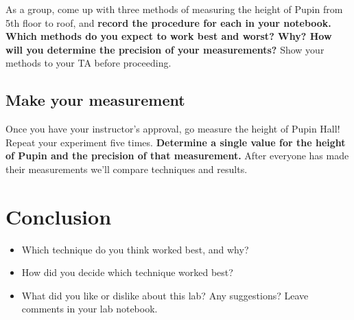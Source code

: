 \documentclass[11pt]{article}%
\newcommand{\SPACE}{\vspace{6em}}
\begin{document}
As a group, come up with three methods of measuring the height of Pupin from 5th floor to roof, and \textbf{record the procedure for each in your notebook. Which methods do you expect to work best and worst? Why? How will you determine the precision of your measurements?} Show your methods to your TA before proceeding. 
\SPACE
\SPACE
\SPACE


\newpage
\subsection{Make your measurement}
Once you have your instructor's approval, go measure the height of Pupin Hall! Repeat your experiment five times. \textbf{Determine a single value for the height of Pupin and the precision of that measurement.} After everyone has made their measurements we'll compare techniques and results.
\SPACE
\SPACE
\SPACE

\section{Conclusion}

\begin{itemize}
\item Which technique do you think worked best, and why?
\SPACE

\item How did you decide which technique worked best?
\SPACE

\item What did you like or dislike about this lab?  Any suggestions? Leave comments in your lab notebook.
\SPACE

\end{itemize}


\end{document}
